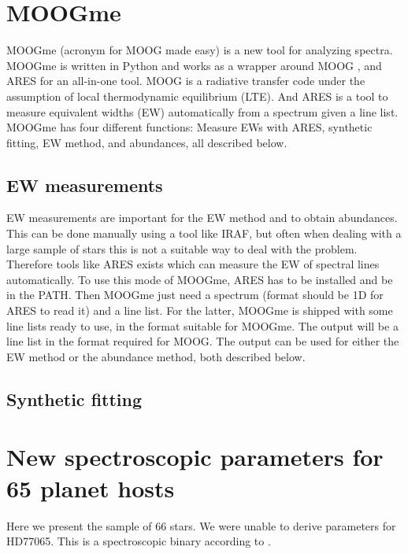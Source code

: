 \documentclass{aa}
\begin{document}
\section{MOOGme}
\label{sec:MOOGme}

MOOGme (acronym for MOOG made easy) is a new tool for analyzing spectra.
MOOGme is written in Python and works as a wrapper around MOOG
\citep{Sneden1973}, and ARES \citep{Sousa2015a} for an all-in-one tool.
MOOG is a radiative transfer code under the assumption of local
thermodynamic equilibrium (LTE). And ARES is a tool to measure equivalent
widths (EW) automatically from a spectrum given a line list. MOOGme has
four different functions: Measure EWs with ARES, synthetic fitting, EW method,
and abundances, all described below.

\subsection{EW measurements}
\label{sub:EW_measurements}
EW measurements are important for the EW method and to obtain abundances. This
can be done manually using a tool like IRAF, but often when dealing with a large
sample of stars this is not a suitable way to deal with the problem. Therefore
tools like ARES exists which can measure the EW of spectral lines automatically.
To use this mode of MOOGme, ARES has to be installed and be in the PATH. Then
MOOGme just need a spectrum (format should be 1D for ARES to read it) and a line
list. For the latter, MOOGme is shipped with some line lists ready to use, in
the format suitable for MOOGme. The output will be a line list in the format
required for MOOG. The output can be used for either the EW method or the
abundance method, both described below.


\subsection{Synthetic fitting}
\label{sub:Synthetic_fitting}



















\section{New spectroscopic parameters for 65 planet hosts}
\label{sec:results}
Here we present the sample of 66 stars. We were unable to derive parameters for
HD77065. This is a spectroscopic binary according to \cite{Pourbaix2004}.
\end{document}
